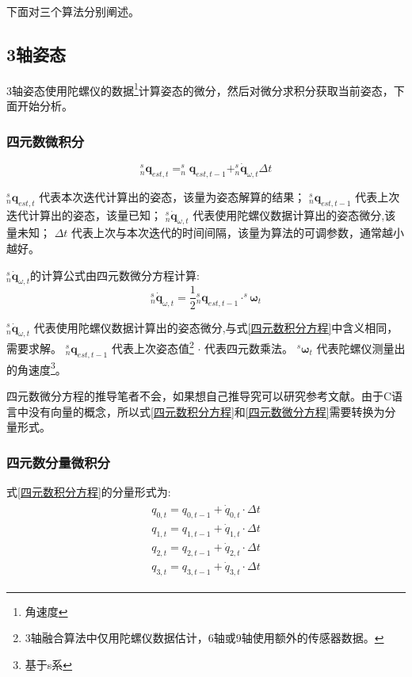 
下面对三个算法分别阐述。
\subsection{3轴姿态}
3轴姿态使用陀螺仪的数据\footnote{角速度}计算姿态的微分，然后对微分求积分获取当前姿态，下面开始分析。
\subsubsection{四元数微积分}
\begin{equation}\label{四元数积分方程}
    ^s_n\bm{q}_{est,t}=^s_n\bm{q}_{est,t-1}+^s_n\dot{{\bm{q}}}_{\omega,t} \Delta t
\end{equation} 

$^s_n\bm{q}_{est,t}$            代表本次迭代计算出的姿态，该量为姿态解算的结果；
$^s_n\bm{q}_{est,t-1}$          代表上次迭代计算出的姿态，该量已知；
$^s_n\dot{{\bm{q}}}_{\omega,t}$ 代表使用陀螺仪数据计算出的姿态微分,该量未知；
$\Delta t$                      代表上次与本次迭代的时间间隔，该量为算法的可调参数，通常越小越好。

$^s_n\dot{{\bm{q}}}_{\omega,t}$的计算公式由四元数微分方程计算:
\begin{equation}\label{四元数微分方程}
    ^s_n\dot{{\bm{q}}}_{\omega,t}=\frac{1}{2}{^s_n\bm{q}_{est,t-1}}\cdot^s{\bm{\omega}}_t
\end{equation} 

$^s_n\dot{{\bm{q}}}_{\omega,t}$ 代表使用陀螺仪数据计算出的姿态微分,与式\ref{四元数积分方程}中含义相同，需要求解。
$^s_n\bm{q}_{est,t-1}$          代表上次姿态值\footnote{3轴融合算法中仅用陀螺仪数据估计，6轴或9轴使用额外的传感器数据。}
$\cdot$                         代表四元数乘法。
$^s\bm{\omega}_t$               代表陀螺仪测量出的角速度\footnote{基于s系}。

四元数微分方程的推导笔者不会，如果想自己推导究可以研究参考文献\citet{四元数微分方程的推导}。由于C语言中没有向量的概念，所以式\ref{四元数积分方程}和\ref{四元数微分方程}需要转换为分量形式。
\subsubsection{四元数分量微积分}
式\ref{四元数积分方程}的分量形式为:
\begin{eqnarray}\label{四元数分量积分方程}
    \begin{split}
        q_{0,t} = q_{0,t-1} + \dot{q}_{0,t} \cdot \Delta t \\ 
        q_{1,t} = q_{1,t-1} + \dot{q}_{1,t} \cdot \Delta t \\
        q_{2,t} = q_{2,t-1} + \dot{q}_{2,t} \cdot \Delta t \\
        q_{3,t} = q_{3,t-1} + \dot{q}_{3,t} \cdot \Delta t
    \end{split}
\end{eqnarray} 

